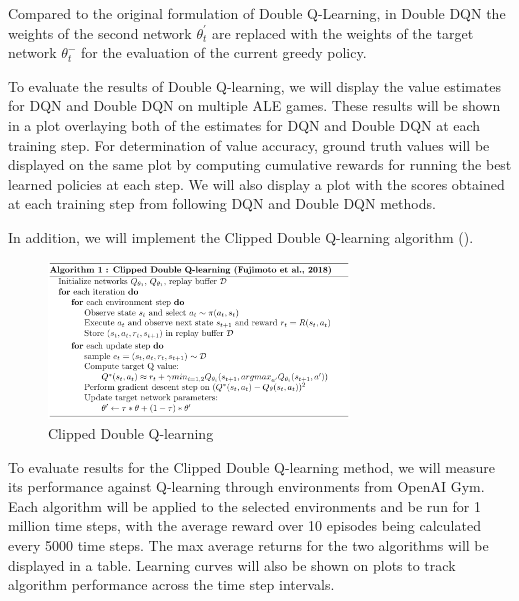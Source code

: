 \documentclass{article}
\begin{document}
Compared to the original formulation of Double Q-Learning, in Double DQN the
weights of the second network $\theta _{t}^{'}$ are replaced with the weights of
the target network $\theta_{t}^{-}$ for the evaluation of the current greedy
policy.

To evaluate the results of Double Q-learning, we will display the value estimates for DQN and Double DQN on multiple ALE games.  These results will be shown in a plot overlaying both of the estimates for DQN and Double DQN at each training step. For determination of value accuracy, ground truth values will be displayed on the same plot by computing cumulative rewards for running the best learned policies at each step. We will also display a plot with the scores obtained at each training step from following DQN and Double DQN methods.



In addition, we will implement the Clipped Double Q-learning
algorithm (\citet{fujimoto2018addressing}). 

\begin{figure}[!htbp]
    \begin{center}
    \includegraphics[width=8cm]{alg1_ClippedDDQ_Fujimoto.png}
    \end{center}
    \caption{Clipped Double Q-learning}
    \label{fig:numcomments}
\end{figure}

To evaluate results for the Clipped Double Q-learning method, we will measure its performance against Q-learning through environments from OpenAI Gym. Each algorithm will be applied to the selected environments and be run for 1 million time steps, with the average reward over 10 episodes being calculated every 5000 time steps. The max average returns for the two algorithms will be displayed in a table. Learning curves will also be shown on plots to track algorithm performance across the time step intervals.
\end{document}

